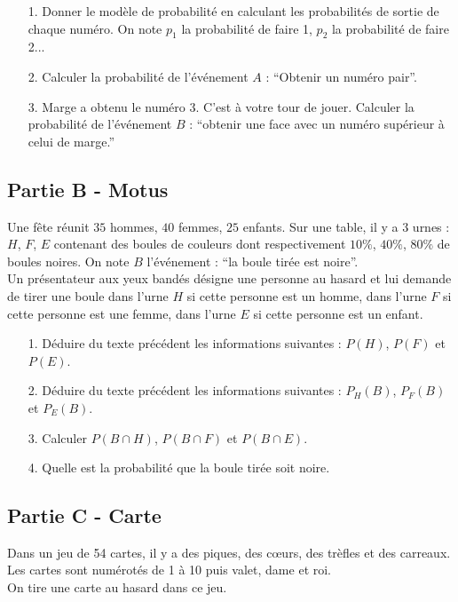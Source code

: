 \documentclass[12pt]{article}
\begin{document}
\begin{enumerate}
\item[1.] Donner le modèle de probabilité en calculant les probabilités de sortie de chaque numéro. On note $p_1$ la probabilité de faire 1, $p_2$ la probabilité de faire 2...
\item[2.] Calculer la probabilité de l'événement $A$ : ``Obtenir un numéro pair''.
\item[3.] Marge a obtenu le numéro 3. C'est à votre tour de jouer. Calculer la probabilité de l'événement $B$ : ``obtenir une face avec un numéro supérieur à celui de marge.''
\end{enumerate}


\subsection*{Partie B - Motus}

Une fête réunit $35$ hommes, $40$ femmes, $25$ enfants. Sur une table, il y a $3$ urnes : $H$, $F$, $E$ contenant des boules de couleurs dont respectivement $10\%$, $40\%$, $80\%$ de boules noires. On note $B$ l'événement : ``la boule tirée est noire''.\\
Un présentateur aux yeux bandés désigne une personne au hasard et lui demande de tirer une boule dans l’urne $H$ si cette personne est un homme, dans l’urne $F$ si cette personne est une femme, dans l’urne $E$ si cette personne est un enfant.

\begin{enumerate}
\item[1.] Déduire du texte précédent les informations suivantes : $P(H)$, $P(F)$ et 
$P(E)$.
\item[2.] Déduire du texte précédent les informations suivantes : $P_H(B)$, $P_F(B)$ et $P_E(B)$.
\item[3.] Calculer $P(B \cap H)$, $P(B \cap F)$ et $P(B \cap E)$.
\item[4.] Quelle est la probabilité que la boule tirée soit noire.
\end{enumerate}

\subsection*{Partie C - Carte}

Dans un jeu de 54 cartes, il y a des piques, des cœurs, des trèfles et des carreaux. Les cartes sont numérotés de 1 à 10 puis valet, dame et roi.\\
On tire une carte au hasard dans ce jeu.
\end{document}
